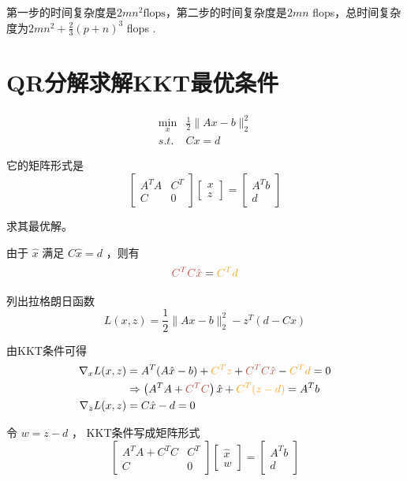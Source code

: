 第一步的时间复杂度是$2 m n^{2}  \text{flops} $，第二步的时间复杂度是$2 {mn} $ flops，总时间复杂度为$ 2 m n^{2}+\frac{2}{3}(p+n)^{3} $ flops .

\section{QR分解求解KKT最优条件}

\begin{problem}
    $$\begin{aligned}
        \min _{x} & \frac{1}{2}\|A x-b\|_{2}^{2}\\
        s.t. & C x=d
    \end{aligned}$$

    它的矩阵形式是
    $$
\left[\begin{array}{cc}
A^{T} A & C^{T} \\
C & 0
\end{array}\right]\left[\begin{array}{l}
x \\
z
\end{array}\right]=\left[\begin{array}{c}
A^{T} b \\
d
\end{array}\right]
$$

求其最优解。
\end{problem}


由于 $ \hat{x} $ 满足 $ C \hat{x}=d $ ，则有 $$\displaystyle \textcolor[rgb]{0.72,0.33,0.31}{C^{T} C\hat{x}} =\textcolor[rgb]{0.96,0.65,0.14}{C^{T} d}$$ 

列出拉格朗日函数
$$
L(x, z)=\frac{1}{2}\|A x-b\|_{2}^{2}-z^{T}(d-C x)
$$

由KKT条件可得
$$\begin{aligned}
    \nabla _{x} L(x,z) & =A^{T} (A\hat{x} -b)+\textcolor[rgb]{0.96,0.65,0.14}{C^{T} z} +\textcolor[rgb]{0.72,0.33,0.31}{C^{T} C\hat{x}} -\textcolor[rgb]{0.96,0.65,0.14}{C^{T} d} =0\\
     & \Rightarrow \left( A^{T} A+\textcolor[rgb]{0.72,0.33,0.31}{C^{T} C}\right)\hat{x} +\textcolor[rgb]{0.96,0.65,0.14}{C^{T} (z-d)} =A^{T} b\\
    \nabla _{z} L(x,z) & =C\hat{x} -d=0
    \end{aligned}
$$

令 $ w=z-d $ ， KKT条件写成矩阵形式
$$
\left[\begin{array}{cc}
A^{T} A+C^{T} C & C^{T} \\
C & 0
\end{array}\right]\left[\begin{array}{l}
\hat{x} \\
w
\end{array}\right]=\left[\begin{array}{c}
A^{T} b \\
d
\end{array}\right]
$$

